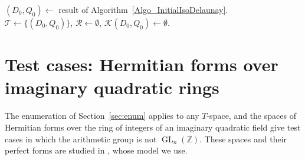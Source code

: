 \documentclass{amsart}
\newcommand{\GL}{\operatorname{GL}}
\newcommand{\ZZ}{\mathbb{Z}}
\begin{document}
\begin{algorithm}
\((D_0,Q_0)\leftarrow\) result of
Algorithm~\ref{Algo_InitialIsoDelaunay}.\\
\({\mathcal T}\leftarrow\{(D_0,Q_0)\}\), \({\mathcal R}\leftarrow\emptyset\),
\({\mathcal K}(D_0,Q_0)\leftarrow\emptyset\).\\
\caption{Enumeration of full-dimensional iso-Delaunay domains}
\label{Algo_IsoDelaunayEnumeration}
\end{algorithm}

\section{Test cases: Hermitian forms over imaginary quadratic rings}
\label{sec:tests}

The enumeration of Section~\ref{sec:enum} applies to any \(T\)-space, and the
spaces of Hermitian forms over the ring of integers of an imaginary quadratic
field give test cases in which the arithmetic group is not \(\GL_n(\ZZ)\).
These spaces and their perfect forms are studied in
\cite{DutourSikiricGanglGunnellsHankeSchurmannYasaki2016}, whose model we
use.
\end{document}
